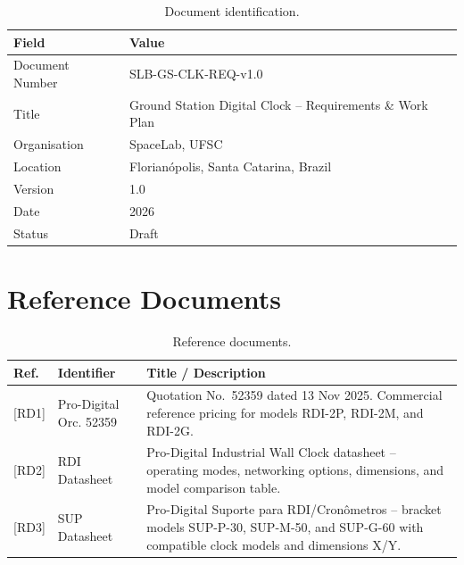 \begin{table}[H]
    \caption{Document identification.}
    \label{tab:doc-id}
    \begin{center}
        \begin{tabular}{L{5cm}L{8cm}}
            \toprule[1.5pt]
            \textbf{Field}          & \textbf{Value} \\
            \midrule
            Document Number         & SLB-GS-CLK-REQ-v1.0 \\
            Title                   & Ground Station Digital Clock -- Requirements \& Work Plan \\
            Organisation            & SpaceLab, UFSC \\
            Location                & Florian\'{o}polis, Santa Catarina, Brazil \\
            Version                 & 1.0 \\
            Date                    & 2026 \\
            Status                  & Draft \\
            \bottomrule[1.5pt]
        \end{tabular}
    \end{center}
\end{table}

\section{Reference Documents}

\begin{table}[H]
    \caption{Reference documents.}
    \label{tab:refs}
    \begin{center}
        \begin{tabular}{C{1.5cm}L{4cm}L{7.5cm}}
            \toprule[1.5pt]
            \textbf{Ref.} & \textbf{Identifier} & \textbf{Title / Description} \\
            \midrule
            {[}RD1{]} & Pro-Digital Orc. 52359 & Quotation No.\ 52359 dated 13 Nov 2025. Commercial reference pricing for models RDI-2P, RDI-2M, and RDI-2G. \\
            {[}RD2{]} & RDI Datasheet & Pro-Digital Industrial Wall Clock datasheet -- operating modes, networking options, dimensions, and model comparison table. \\
            {[}RD3{]} & SUP Datasheet & Pro-Digital Suporte para RDI/Cron\^{o}metros -- bracket models SUP-P-30, SUP-M-50, and SUP-G-60 with compatible clock models and dimensions X/Y. \\
            \bottomrule[1.5pt]
        \end{tabular}
    \end{center}
\end{table}
